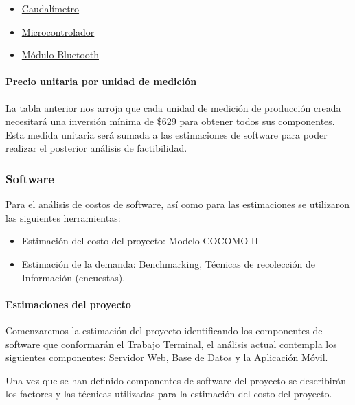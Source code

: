 \begin{itemize}
	\item  \href{https://articulo.mercadolibre.com.mx/MLM-563607650-caudalimetro-sensor-de-flujo-liquidos-1-pulgada-1-a-60-lmin-_JM?fbclid=IwAR1_qJeWVCpg_5bPhjg7R-Mcx2q9eO3CDDKzBXMvJtp12USAU0zp46vphmk}{Caudalímetro}
	\item \href{https://articulo.mercadolibre.com.mx/MLM-552397250-modulo-bluetooth-hc-06-para-arduino-pic-raspberry-_JM?matt_tool=&matt_word=&gclid=CjwKCAjw9sreBRBAEiwARroYm1LdtLoloDq74O455SEt5xQutPzGfCwV67LSzx-MMpatIKUnfq6yphoCuKMQAvD_BwE}{Microcontrolador}
	\item \href{https://www.microchip.com/wwwproducts/en/ATmega16}{Módulo Bluetooth} 
\end{itemize}

\paragraph{Precio unitaria por unidad de medición}La tabla anterior nos arroja que cada unidad de medición de producción creada necesitará una inversión mínima de \$629 para obtener todos sus componentes. Esta medida unitaria será sumada a las estimaciones de software para poder realizar el posterior análisis de factibilidad.


\subsubsection{Software}
Para el análisis de costos de software, así como para las estimaciones se utilizaron las siguientes herramientas:
\begin{itemize}
	\item Estimación del costo del proyecto: Modelo COCOMO II
	\item Estimación de la demanda: Benchmarking, Técnicas de recolección de Información (encuestas).
\end{itemize}


\paragraph{Estimaciones del proyecto}
Comenzaremos la estimación del proyecto identificando los componentes de software que conformarán el Trabajo Terminal, el análisis actual contempla los siguientes componentes: Servidor Web, Base de Datos y la Aplicación Móvil.

Una vez que se han definido componentes de software del proyecto se describirán los factores y las técnicas utilizadas para la estimación del costo del proyecto.

